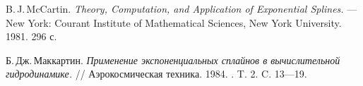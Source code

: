 \begin{thebibliography}{99}
B.\,J.\,McCartin. {\itshape Theory, Computation, and Application of Exponential Splines.} --- New York: Courant Institute of Mathematical Sciences, New York University. 1981. 296 с.

Б.\,Дж.\,Маккартин. {\itshape Применение экспоненциальных сплайнов в вычислительной гидродинамике.} // Аэрокосмическая техника. 1984. . T. 2. C. 13---19.
\end{thebibliography}
\pagebreak


